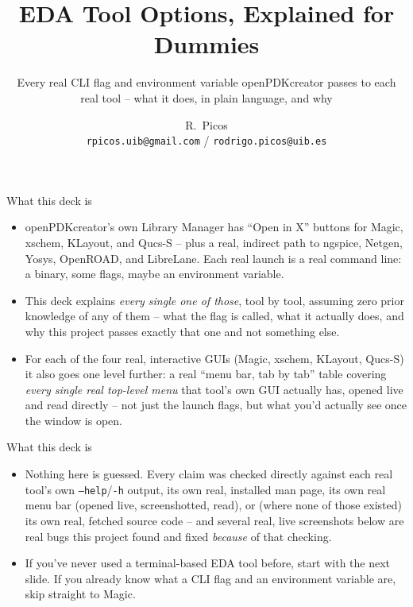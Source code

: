\documentclass[aspectratio=169]{beamer}
\title{EDA Tool Options, Explained for Dummies}
\subtitle{Every real CLI flag and environment variable openPDKcreator passes to each real tool -- what it does, in plain language, and why}
\author{R.~Picos\\{\small\texttt{rpicos.uib@gmail.com} / \texttt{rodrigo.picos@uib.es}}}
\institute{Project PID2025-170062NB (MemFRAME) funded by\\MICIU/AEI/10.13039/501100011033}
\date{}
\begin{document}
\frame{\titlepage}

\begin{frame}{What this deck is}
\begin{itemize}
  \item openPDKcreator's own Library Manager has ``Open in X'' buttons
        for Magic, xschem, KLayout, and Qucs-S -- plus a real,
        indirect path to ngspice, Netgen, Yosys, OpenROAD, and
        LibreLane. Each real launch is a real command line: a binary,
        some flags, maybe an environment variable.
  \item This deck explains \emph{every single one of those}, tool by
        tool, assuming zero prior knowledge of any of them -- what
        the flag is called, what it actually does, and why this
        project passes exactly that one and not something else.
  \item For each of the four real, interactive GUIs (Magic, xschem,
        KLayout, Qucs-S) it also goes one level further: a real
        ``menu bar, tab by tab'' table covering \emph{every single
        real top-level menu} that tool's own GUI actually has, opened
        live and read directly -- not just the launch flags, but what
        you'd actually see once the window is open.
\end{itemize}
\end{frame}
\begin{frame}{What this deck is}
\begin{itemize}
  \item Nothing here is guessed. Every claim was checked directly
        against each real tool's own \texttt{--help}/\texttt{-h}
        output, its own real, installed man page, its own real menu
        bar (opened live, screenshotted, read), or (where none of
        those existed) its own real, fetched source code -- and
        several real, live screenshots below are real bugs this
        project found and fixed \emph{because} of that checking.
  \item If you've never used a terminal-based EDA tool before, start with the next slide. If you already know what a CLI flag and an environment variable are, skip straight to Magic.
\end{itemize}
\end{frame}
\end{document}
